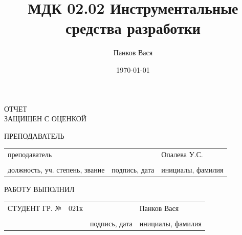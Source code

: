 \documentclass[14pt]{extarticle}
\author{Панков Вася}
\date{\today}
\title{МДК 02.02 Инструментальные средства разработки}
\begin{document}
\begin{titlepage}


\vspace{32pt}


\vspace{60pt}

\raggedright{ОТЧЕТ \\
ЗАЩИЩЕН С ОЦЕНКОЙ}
\vspace{14pt}

\raggedright{ПРЕПОДАВАТЕЛЬ}

\vspace{12pt}

\begin{tabularx}{\textwidth}{ >{\centering\arraybackslash}X >{\centering\arraybackslash}X >{\centering\arraybackslash}X }
	 преподаватель & & Опалева У.С. \\ 
	 \hrulefill & \hrulefill & \hrulefill \\ 
\footnotesize{должность, уч. степень, звание} & \footnotesize{подпись, дата} & \footnotesize{инициалы, фамилия} \\ 
\end{tabularx} 
 
\vspace{48pt} 


\vspace{76pt} 


\vspace*{\fill} 

\raggedright{РАБОТУ ВЫПОЛНИЛ} 

\vspace{10pt} 

\begin{tabularx}{\textwidth}{>{\raggedright\arraybackslash}X  >{\centering\arraybackslash}X >{\centering\arraybackslash}X >{\centering\arraybackslash}X }
	 СТУДЕНТ ГР. № & 021к & & Панков Вася \\ 
	 & \hrulefill & \hrulefill & \hrulefill \\ 
	 &  & \footnotesize{подпись, дата} & \footnotesize{инициалы, фамилия} \\ 
\end{tabularx} 
 
\vspace*{\fill} 


\end{titlepage}
\end{document}
